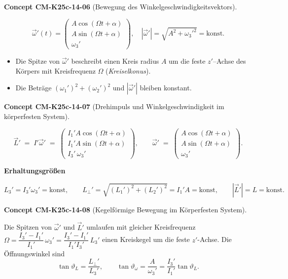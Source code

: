 \documentclass[10pt, letterpaper]{article}
\newcommand{\CustomHeading}[3]{%
  \par\medskip\noindent%
  \textbf{#1 #2} \textnormal{(#3)}.\enskip%
}
\newenvironment{CONC}[2]{\CustomHeading{Concept}{#1}{#2}}{}
\begin{document}
\begin{CONC}{CM-K25c-14-06}{Bewegung des Winkelgeschwindigkeitsvektors}
\[
\vec\omega'(t)=
\begin{pmatrix}
A\cos(\Omega t+\alpha)\\
A\sin(\Omega t+\alpha)\\
\omega_3'
\end{pmatrix},
\quad
|\vec\omega'|=\sqrt{A^{2}+{\omega_3'}^{2}}=\text{konst}.
\]

\begin{itemize}
\item Die Spitze von $\vec\omega'$ beschreibt einen Kreis radius $A$ um die feste $z'$–Achse des Körpers mit Kreisfrequenz $\Omega$ (\emph{Kreiselkonus}).  
\item Die Beträge $(\omega_1')^{2}+(\omega_2')^{2}$ und $|\vec\omega'|$ bleiben konstant.
\end{itemize}
\end{CONC}

\begin{CONC}{CM-K25c-14-07}{Drehimpuls und Winkelgeschwindigkeit im körperfesten System}
\[
\vec L' \;=\; I'\vec\omega'
           \;=\;
           \begin{pmatrix}
             I_1' A\cos(\Omega t+\alpha)\\
             I_1' A\sin(\Omega t+\alpha)\\
             I_3'\,\omega_3'
           \end{pmatrix},
\qquad
\vec\omega'
           \;=\;
           \begin{pmatrix}
             A\cos(\Omega t+\alpha)\\
             A\sin(\Omega t+\alpha)\\
             \omega_3'
           \end{pmatrix}.
\]

\textbf{Erhaltungsgrößen}

\[
L_3' = I_3'\omega_3' = \text{konst},
\qquad
L_\perp' = \sqrt{(L_1')^{2}+(L_2')^{2}} = I_1' A = \text{konst},
\qquad
|\vec L'| = L = \text{konst}.
\]
\end{CONC}

\begin{CONC}{CM-K25c-14-08}{Kegelförmige Bewegung im Körperfesten System}
Die Spitzen von $\vec\omega'$ und $\vec L'$ umlaufen mit gleicher Kreisfrequenz
\(
  \Omega = \dfrac{I_3'-I_1'}{I_1'}\,\omega_3'
         = \dfrac{I_3'-I_1'}{I_1'I_3'}\,L_3'
\)
einen Kreiskegel um die feste $z'$-Achse.
Die Öffnungswinkel sind
\[
\tan\vartheta_L=\frac{L_\perp'}{L_3'}, 
\qquad
\tan\vartheta_\omega=\frac{A}{\omega_3'}
                    =\frac{I_3'}{I_1'}\tan\vartheta_L .
\]
\end{CONC}
\end{document}
